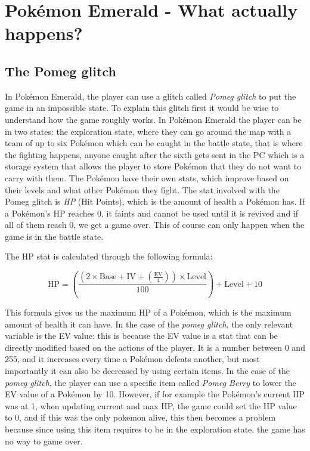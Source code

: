 \documentclass[a4paper]{usiinfbachelorproject}
\begin{document}
\section{\textbf{Pokémon Emerald - What actually happens?}}
\subsection{\textbf{The Pomeg glitch}}
In Pokémon Emerald, the player can use a glitch called \textit{Pomeg glitch} to put the game in an impossible state. To explain this glitch first it would be wise to understand how the game roughly works. In Pokémon Emerald the player can be in two states: the exploration state, where they can go around the map with a team of up to six Pokémon which can be caught in the battle state, that is where the fighting happens, anyone caught after the sixth gets sent in the PC which is a storage system that allows the player to store Pokémon that they do not want to carry with them. The Pokémon have their own stats, which improve based on their levels and what other Pokémon they fight. The stat involved with the Pomeg glitch is \textit{HP} (Hit Points), which is the amount of health a Pokémon has. If a Pokémon's HP reaches 0, it faints and cannot be used until it is revived and if all of them reach 0, we get a game over. This of course can only happen when the game is in the battle state.

The HP stat is calculated through the following formula:

\[
	\text{HP} = \left( \frac{(2 \times \text{Base} + \text{IV} + \left( \frac{\text{EV}}{4} \right)) \times \text{Level}}{100} \right) + \text{Level} + 10
\]

This formula gives us the maximum HP of a Pokémon, which is the maximum amount of health it can have. In the case of the \textit{pomeg glitch}, the only relevant variable is the EV value: this is because the EV value is a stat that can be directly modified based on the actions of the player. It is a number between 0 and 255, and it increases every time a Pokémon defeats another, but most importantly it can also be decreased by using certain items. In the case of the \textit{pomeg glitch}, the player can use a specific item called \textit{Pomeg Berry} to lower the EV value of a Pokémon by 10. However, if for example the Pokémon's current HP was at 1, when updating current and max HP, the game could set the HP value to 0, and if this was the only pokemon alive, this then becomes a problem because since using this item requires to be in the exploration state, the game has no way to game over.
\end{document}

